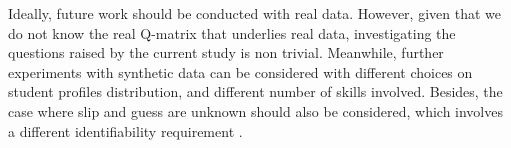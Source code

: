 \documentclass{edm_template}
\begin{document}
Ideally, future work should be conducted with real data.  However, given that we do not know the real Q-matrix that underlies real data, investigating the questions raised by the current study is non trivial.  Meanwhile, further experiments with synthetic data can be considered with different choices on student profiles distribution, and different number of skills involved. Besides, the case where slip and guess are unknown should also be considered, which involves a different identifiability requirement \cite{xu2015identifiability}. 



\end{document}

